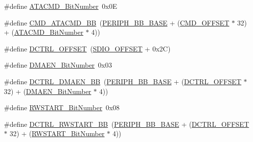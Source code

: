 \begin{DoxyCompactItemize}
\item 
\#define \hyperlink{group___s_d_i_o___private___types_definitions_gabd4fd3bb700b879f843ccc867db1832e}{A\+T\+A\+C\+M\+D\+\_\+\+Bit\+Number}~0x0E
\item 
\#define \hyperlink{group___s_d_i_o___private___types_definitions_gabb7e537f931b6fdd3b49e826f2e19d7c}{C\+M\+D\+\_\+\+A\+T\+A\+C\+M\+D\+\_\+\+BB}~(\hyperlink{openmotestm_2library_2inc_2stm32f10x__map_8h_aed7efc100877000845c236ccdc9e144a}{P\+E\+R\+I\+P\+H\+\_\+\+B\+B\+\_\+\+B\+A\+SE} + (\hyperlink{openmotestm_2library_2src_2stm32f10x__sdio_8c_af12d26702ce7a88d2a3dae87f000b75e}{C\+M\+D\+\_\+\+O\+F\+F\+S\+ET} $\ast$ 32) + (\hyperlink{openmotestm_2library_2src_2stm32f10x__sdio_8c_abd4fd3bb700b879f843ccc867db1832e}{A\+T\+A\+C\+M\+D\+\_\+\+Bit\+Number} $\ast$ 4))
\item 
\#define \hyperlink{group___s_d_i_o___private___types_definitions_ga948c1382c4cfd3af3e406c4d0cdd4240}{D\+C\+T\+R\+L\+\_\+\+O\+F\+F\+S\+ET}~(\hyperlink{openmotestm_2library_2src_2stm32f10x__sdio_8c_abf07aced03df5f46d57cea1d4f56d1e3}{S\+D\+I\+O\+\_\+\+O\+F\+F\+S\+ET} + 0x2\+C)
\item 
\#define \hyperlink{group___s_d_i_o___private___types_definitions_gab2af311e327213503f0dbf3d013b7944}{D\+M\+A\+E\+N\+\_\+\+Bit\+Number}~0x03
\item 
\#define \hyperlink{group___s_d_i_o___private___types_definitions_ga43f7336d4f955c6cf1f676ccbc043fe9}{D\+C\+T\+R\+L\+\_\+\+D\+M\+A\+E\+N\+\_\+\+BB}~(\hyperlink{openmotestm_2library_2inc_2stm32f10x__map_8h_aed7efc100877000845c236ccdc9e144a}{P\+E\+R\+I\+P\+H\+\_\+\+B\+B\+\_\+\+B\+A\+SE} + (\hyperlink{openmotestm_2library_2src_2stm32f10x__sdio_8c_a948c1382c4cfd3af3e406c4d0cdd4240}{D\+C\+T\+R\+L\+\_\+\+O\+F\+F\+S\+ET} $\ast$ 32) + (\hyperlink{openmotestm_2library_2src_2stm32f10x__sdio_8c_ab2af311e327213503f0dbf3d013b7944}{D\+M\+A\+E\+N\+\_\+\+Bit\+Number} $\ast$ 4))
\item 
\#define \hyperlink{group___s_d_i_o___private___types_definitions_ga773045c51d3e8daee0c181517c44a2df}{R\+W\+S\+T\+A\+R\+T\+\_\+\+Bit\+Number}~0x08
\item 
\#define \hyperlink{group___s_d_i_o___private___types_definitions_gac776c39dfac0e1ed007217133e1145c3}{D\+C\+T\+R\+L\+\_\+\+R\+W\+S\+T\+A\+R\+T\+\_\+\+BB}~(\hyperlink{openmotestm_2library_2inc_2stm32f10x__map_8h_aed7efc100877000845c236ccdc9e144a}{P\+E\+R\+I\+P\+H\+\_\+\+B\+B\+\_\+\+B\+A\+SE} + (\hyperlink{openmotestm_2library_2src_2stm32f10x__sdio_8c_a948c1382c4cfd3af3e406c4d0cdd4240}{D\+C\+T\+R\+L\+\_\+\+O\+F\+F\+S\+ET} $\ast$ 32) + (\hyperlink{openmotestm_2library_2src_2stm32f10x__sdio_8c_a773045c51d3e8daee0c181517c44a2df}{R\+W\+S\+T\+A\+R\+T\+\_\+\+Bit\+Number} $\ast$ 4))

\end{DoxyCompactItemize}
